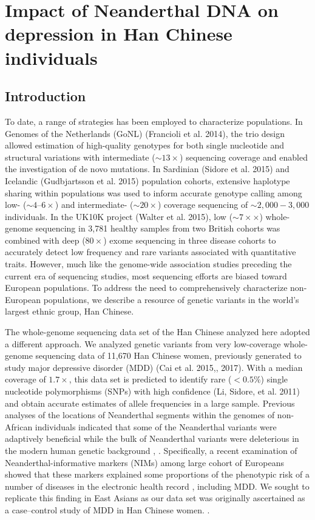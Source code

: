 \chapter{Impact of Neanderthal DNA on depression in Han Chinese individuals}
\section{Introduction}
To date, a range of strategies has been employed to characterize populations. In Genomes of the Netherlands (GoNL) (Francioli et al. 2014), the trio design allowed estimation of high-quality genotypes for both single nucleotide and structural variations with intermediate ($\sim13\times$) sequencing coverage and enabled the investigation of de novo mutations. In Sardinian (Sidore et al. 2015) and Icelandic (Gudbjartsson et al. 2015) population cohorts, extensive haplotype sharing within populations was used to inform accurate genotype calling among low- ($\sim4 – 6\times$) and intermediate- ($\sim20\times$) coverage sequencing of $\sim2,000 - 3,000$ individuals. In the UK10K project (Walter et al. 2015), low ($\sim7×\times$) whole-genome sequencing in 3,781 healthy samples from two British cohorts was combined with deep ($80\times$) exome sequencing in three disease cohorts to accurately detect low frequency and rare variants associated with quantitative traits. However, much like the genome-wide association studies preceding the current era of sequencing studies, most sequencing efforts are biased toward European populations. To address the need to comprehensively characterize non-European populations, we describe a resource of genetic variants in the world’s largest ethnic group, Han Chinese.

The whole-genome sequencing data set of the Han Chinese analyzed here adopted a different approach. We analyzed genetic variants from very low-coverage whole-genome sequencing data of 11,670 Han Chinese women, previously generated to study major depressive disorder (MDD) (Cai et al. 2015,, 2017). With a median coverage of $1.7\times$, this data set is predicted to identify rare ($<0.5\%$) single nucleotide polymorphisms (SNPs) with high confidence (Li, Sidore, et al. 2011) and obtain accurate estimates of allele frequencies in a large sample. 
Previous analyses of the locations of Neanderthal segments within the genomes of non-African individuals indicated that some of the Neanderthal variants were adaptively beneficial while the bulk of Neanderthal variants were deleterious in the modern human genetic background \cite{harris2016genetic}, \cite{juric2016strength}. Specifically, a recent examination of Neanderthal-informative markers (NIMs) among large cohort of Europeans showed that these markers explained some proportions of the phenotypic risk of a number of diseases in the electronic health record \cite{simonti2016phenotypic}, including MDD. We sought to replicate this finding in East Asians as our data set was originally ascertained as a case–control study of MDD in Han Chinese women. \cite{cai2015sparse}.
